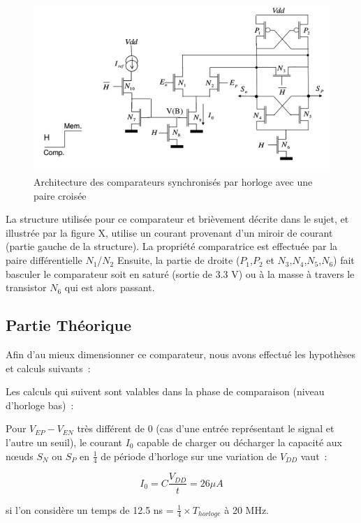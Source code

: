 \documentclass[11pt]{article}
\begin{document}
\begin{figure}[!htb]
\begin{center}
  \includegraphics[scale=0.38]{comparateur_schema.jpg}
  \caption{Architecture des comparateurs synchronis\'es par horloge avec une paire crois\'ee}
\end{center}
\end{figure}

La structure utilis\'ee pour ce comparateur et bri\`evement d\'ecrite dans le sujet, et illustr\'ee par
la figure X, utilise un courant provenant d'un miroir de courant (partie gauche de la structure).
La propri\'et\'e comparatrice est effectu\'ee par la paire diff\'erentielle $N_1$/$N_2$ Ensuite, la partie de droite
($P_1$,$P_2$ et $N_3$,$N_4$,$N_5$,$N_6$) fait basculer le comparateur soit en satur\'e (sortie de 3.3 V)
ou \`a la masse \`a travers le transistor $N_6$ qui est alors passant.

\subsection{Partie Th\'eorique}
Afin d'au mieux dimensionner ce comparateur, nous avons effectu\'e les hypoth\`eses et calculs suivants :

Les calculs qui suivent sont valables dans la phase de comparaison (niveau d'horloge bas) :

Pour $V_{EP}-V_{EN}$ tr\`es diff\'erent de $0$ (cas d'une entr\'ee repr\'esentant le signal et l'autre un seuil),
le courant $I_0$ capable de charger ou d\'echarger la capacit\'e aux nœuds $S_N$ ou $S_P$ en $\frac{1}{4}$ de
p\'eriode d'horloge sur une variation de $V_{DD}$ vaut :

\[
I_0 = C \frac{V_{DD}}{t} = 26 \mu A
\]

si l’on consid\`ere un temps de 12.5 ns = $\frac{1}{4} \times T_{horloge}$ \`a 20 MHz.
\end{document}
